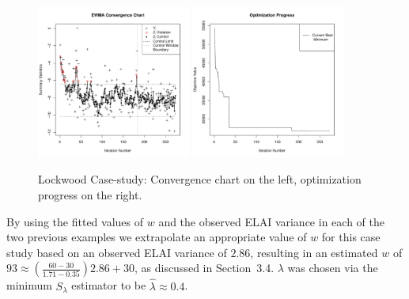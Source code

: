 \documentclass{article}
\begin{document}

%
\begin{figure}[htb]
        \centering
        \includegraphics[width=0.45\textwidth]{./figures/ewmaConvChartLock6Three20000End.pdf}
        \includegraphics[width=0.45\textwidth]{./figures/bestZLock6Three20000End.pdf}
        \caption{Lockwood Case-study: Convergence chart on the left, optimization progress on the right.}
        \label{lock6EWMAEnd}
\end{figure}
%
%

%
By using the fitted values of $w$ and the observed ELAI variance in each of 
the two previous examples we extrapolate an appropriate value of $w$ for this 
case study based on an observed ELAI variance of $2.86$, resulting in an 
estimated $w$ of $93\approx\left(\frac{60-30}{1.71-0.35}\right)2.86+30$, 
as discussed in Section~3.4. $\lambda$ was chosen via the minimum 
$S_\lambda$ estimator to be $\hat\lambda\approx 0.4$.
\end{document}
